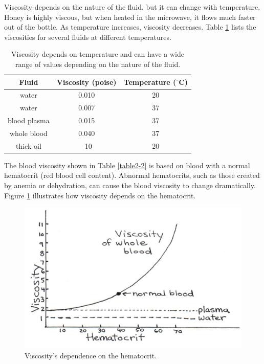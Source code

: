 Viscosity depends on the nature of the fluid, but it can change with temperature.  Honey is highly viscous, but when heated in the microwave, it flows much faster out of the bottle.  As temperature increases, viscosity decreases.  Table \ref{table2-3} lists the viscosities for several fluids at different temperatures.  
\begin{table}[h]
\begin{center}
\begin{tabular}{|c|c|c|}
\hline
Fluid & Viscosity (poise) & Temperature ($^{\circ}$C) \\
\hline
water & 0.010 & 20 \\
water & 0.007 & 37 \\
blood plasma & 0.015 & 37 \\
whole blood & 0.040  & 37\\
thick oil & ~10 & 20 \\
\hline
\end{tabular}
\caption{Viscosity depends on temperature and can have a wide range of values depending on the nature of the fluid.}
\label{table2-3}
\end{center}
\end{table}
The blood viscosity shown in Table \ref{table2-2} is based on blood with a normal hematocrit (red blood cell content).  Abnormal hematocrits, such as those created by anemia or dehydration, can cause the blood viscosity to change dramatically.   Figure \ref{Fig2-9} illustrates how viscosity depends on the hematocrit. 
\begin{figure}[htb]
	\centering
	\includegraphics[width=\textwidth]{./figures/Topic2/Fig2-8.jpg}
	\caption{Viscosity’s dependence on the hematocrit.}
	\label{Fig2-9}
\end{figure}
